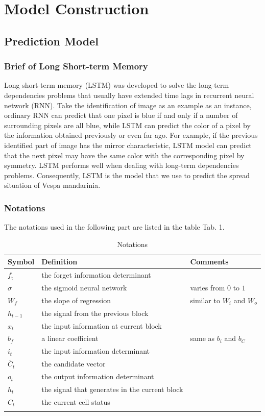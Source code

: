 \documentclass{mcmthesis}
\begin{document}
\section{Model Construction}

\subsection{Prediction Model}
\subsubsection{Brief of Long Short-term Memory}
Long short-term memory (LSTM) was developed to solve the long-term dependencies problems that usually have extended time lags in recurrent neural network (RNN). Take the identification of image as an example as an instance, ordinary RNN can predict that one pixel is blue if and only if a number of surrounding pixels are all blue, while LSTM can predict the color of a pixel by the information obtained previously or even far ago. For example, if the previous identified part of image has the mirror characteristic, LSTM model can predict that the next pixel may have the same color with the corresponding pixel by symmetry. LSTM performs well when dealing with long-term dependencies problems.
Consequently, LSTM is the model that we use to predict the spread situation of Vespa mandarinia.
\subsubsection{Notations}
The notations used in the following part are listed in the table Tab. 1.

\begin{table}[htbp]
\centering
\begin{tabular}{lll}
\hline 
Symbol & Definition & Comments \\
\hline
$f_{\text {t }}$ & the forget information determinant & \\
$\sigma$ & the sigmoid neural network & varies from 0 to $1$ \\
$W_{f}$ & the slope of regression & similar to $W_{i} $ and $W_{o}$\\
$h_{t-1}$ & the signal from the previous block & \\
$x_{t}$ & the input information at current block & \\
$b_{f}$ & a linear coefficient & same as $b_{i}$ and $b_{C}$\\
$i_{t }$ & the input information determinant &  \\
$\tilde{C_{t }}$ & the candidate vector &  \\
$o_{t }$ & the output information determinant &  \\
$h_{t }$ & the signal that generates in the current block &  \\
$C_{t }$ & the current cell status  &  \\
\hline
\label{tab:1}
\end{tabular}
\caption{Notations}
\end{table}
\end{document}
